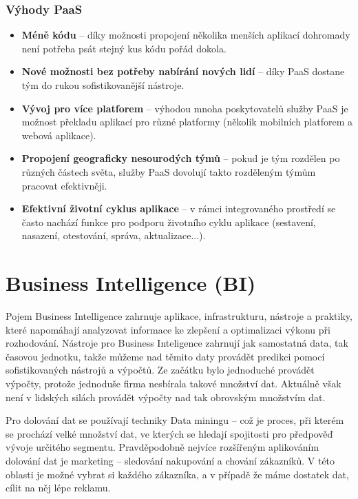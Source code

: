 \subsubsection{Výhody PaaS}
\begin{itemize}
\item \textbf{Méně kódu} -- díky možnosti propojení několika menších aplikací dohromady není potřeba psát stejný kus kódu pořád dokola.
\item \textbf{Nové možnosti bez potřeby nabírání nových lidí} -- díky PaaS dostane tým do rukou sofistikovanější nástroje.
\item \textbf{Vývoj pro více platforem} -- výhodou mnoha poskytovatelů služby PaaS je možnost překladu aplikací pro různé platformy (několik mobilních platforem a webová aplikace).
\item \textbf{Propojení geograficky nesourodých týmů} -- pokud je tým rozdělen po různých částech světa, služby PaaS dovolují takto rozděleným týmům pracovat efektivněji.
\item \textbf{Efektivní životní cyklus aplikace} -- v rámci integrovaného prostředí se často nachází funkce pro podporu životního cyklu aplikace (sestavení, nasazení, otestování, správa, aktualizace...). \cite{co-je-paas}
\end{itemize}

\section{Business Intelligence (BI)}
\par Pojem Business Intelligence zahrnuje aplikace, infrastrukturu, nástroje a praktiky, které napomáhají analyzovat informace ke zlepšení a optimalizaci výkonu při rozhodování. Nástroje pro Business Inteligence zahrnují jak samostatná data, tak časovou jednotku, takže můžeme nad těmito daty provádět predikci pomocí sofistikovaných nástrojů a výpočtů. Ze začátku bylo jednoduché provádět výpočty, protože jednoduše firma nesbírala takové množství dat. Aktuálně však není v lidských silách provádět výpočty nad tak obrovským množstvím dat. \cite{data-science-business}

\par Pro dolování dat se používají techniky Data miningu -- což je proces, při kterém se prochází velké množství dat, ve kterých se hledají spojitosti pro předpověď vývoje určitého segmentu. Pravděpodobně nejvíce rozšířeným aplikováním dolování dat je marketing -- sledování nakupování a chování zákazníků. V této oblasti je možné vybrat si každého zákazníka, a v případě že máme dostatek dat, cílit na něj lépe reklamu. \cite{data-science-business}


